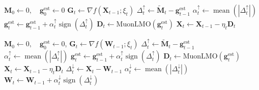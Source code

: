 \begin{minipage}[t]{0.49\linewidth}
\setlength{\algwidth}{\linewidth}
\vspace{0pt}
\begin{algorithm}[H]
\algnarrow
    \caption{EF21-MuonUSign}
    \label{central_alg_ef}
    \begin{algorithmic}[1]
    \State $\mathbf{M}_0 \gets 0,\quad \mathbf{g}_0^{\mathrm{est}} \gets 0$
        \State $\mathbf{G}_t \gets \nabla f(\mathbf{X}_{t-1};\xi_t)$
        \State {}
        \State $\Delta_t^{\uparrow} \gets \tilde{\mathbf{M}}_t - \mathbf{g}_{t-1}^{\mathrm{est}}$
        \State $\alpha_t^{\uparrow} \gets \operatorname{mean}(|\Delta_t^{\uparrow}|)$
        \State $\mathbf{g}_{t}^{\mathrm{est}} \gets \mathbf{g}_{t-1}^{\mathrm{est}} + \alpha_t^{\uparrow}\operatorname{sign}(\Delta_t^{\uparrow})$
        \State $\mathbf{D}_t \gets \mathrm{MuonLMO}(\mathbf{g}_{t}^{\mathrm{est}})$
        \State $\mathbf{X}_{t} \gets \mathbf{X}_{t-1} - \eta_t\mathbf{D}_t$
    \EndFor
    \end{algorithmic}
\end{algorithm}

\end{minipage}\hfill
\begin{minipage}[t]{0.49\linewidth}
\setlength{\algwidth}{\linewidth}
\vspace{0pt}
\begin{algorithm}[H]
\algnarrow
    \caption{EF21-MuonSign}
    \label{central_alg_ud}
    \begin{algorithmic}[1]
    \State $\mathbf{M}_0 \gets 0,\quad \mathbf{g}_0^{\mathrm{est}} \gets 0$, 
        \State $\mathbf{G}_t \gets \nabla f(\mathbf{W}_{t-1};\xi_t)$
        \State {}
        \State $\Delta_t^{\uparrow} \gets \tilde{\mathbf{M}}_t - \mathbf{g}_{t-1}^{\mathrm{est}}$
        \State $\alpha_t^{\uparrow} \gets \operatorname{mean}(|\Delta_t^{\uparrow}|)$
        \State $\mathbf{g}_{t}^{\mathrm{est}} \gets \mathbf{g}_{t-1}^{\mathrm{est}} + \alpha_t^{\uparrow}\operatorname{sign}(\Delta_t^{\uparrow})$
        \State $\mathbf{D}_t \gets \mathrm{MuonLMO}(\mathbf{g}_{t}^{\mathrm{est}})$
        \State $\mathbf{X}_{t} \gets \mathbf{X}_{t-1} - \eta_t\mathbf{D}_t$
        \State $\Delta_t^{\downarrow} \gets \mathbf{X}_{t} - \mathbf{W}_{t-1}$
        \State $\alpha_t^{\downarrow} \gets \operatorname{mean}(|\Delta_t^{\downarrow}|)$
        \State $\mathbf{W}_{t} \gets \mathbf{W}_{t-1} + \alpha_t^{\downarrow}\operatorname{sign}(\Delta_t^{\downarrow})$
    \EndFor
    \end{algorithmic}
\end{algorithm}

\end{minipage}
\par\medskip

